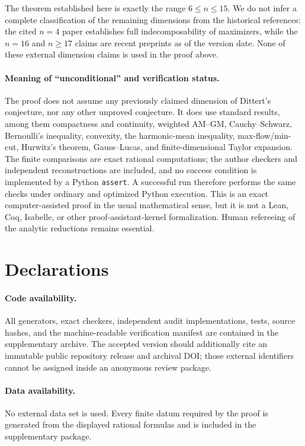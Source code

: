 \documentclass[11pt,a4paper]{article}
\numberwithin{equation}{section}
\theoremstyle{definition}
\newcommand{\1}{\mathbf{1}}
\begin{document}
The theorem established here is exactly the range $6\le n\le15$.  We do not
infer a complete classification of the remaining dimensions from the
historical references: the cited $n=4$ paper establishes full
indecomposability of maximizers, while the $n=16$ and $n\ge17$ claims are
recent preprints as of the version date.  None of these external dimension
claims is used in the proof above.

\paragraph{Meaning of ``unconditional'' and verification status.}
The proof does not assume any previously claimed dimension of Dittert's
conjecture, nor any other unproved conjecture.  It does use standard results,
among them compactness and continuity, weighted AM--GM, Cauchy--Schwarz,
Bernoulli's inequality, convexity, the harmonic-mean inequality,
max-flow/min-cut, Hurwitz's theorem, Gauss--Lucas, and finite-dimensional
Taylor expansion.  The finite comparisons are exact rational computations;
the author checkers and independent reconstructions are included, and no
success condition is implemented by a Python \texttt{assert}.  A successful
run therefore performs the same checks under ordinary and optimized Python
execution.  This is an exact computer-assisted proof in the usual
mathematical sense, but it is not a Lean, Coq, Isabelle, or other
proof-assistant-kernel formalization.  Human refereeing of the analytic
reductions remains essential.

\section*{Declarations}
\paragraph{Code availability.}
All generators, exact checkers, independent audit implementations, tests,
source hashes, and the machine-readable verification manifest are contained
in the supplementary archive.  The accepted version should additionally
cite an immutable public repository release and archival DOI; those external
identifiers cannot be assigned inside an anonymous review package.

\paragraph{Data availability.}
No external data set is used.  Every finite datum required by the proof is
generated from the displayed rational formulas and is included in the
supplementary package.
\end{document}
